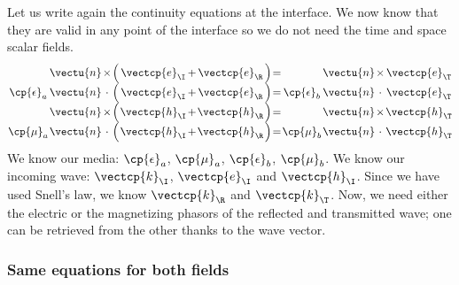 Let us write again the continuity equations at the interface.
We now know that they are valid in any point of the interface so we do not need the time and space scalar fields.
\begin{equation}
    \arraycolsep=0.5pt%
    \begin{array}{ccccccccccccc}
        & \vectu{n} & \times & \Big( & \vectcp{e}_\I & + & \vectcp{e}_\R & \Big) & = & & \vectu{n} & \times & \vectcp{e}_\T
        \\
        \cp{\epsilon}_a & \vectu{n} & \cdot & \Big( & \vectcp{e}_\I & + & \vectcp{e}_\R & \Big) & = & \cp{\epsilon}_b & \vectu{n} & \cdot & \vectcp{e}_\T
        \\
        & \vectu{n} & \times & \Big( & \vectcp{h}_\I & + & \vectcp{h}_\R & \Big) & = &  & \vectu{n} & \times & \vectcp{h}_\T
        \\
        \cp{\mu}_a & \vectu{n} & \cdot & \Big( & \vectcp{h}_\I & + & \vectcp{h}_\R & \Big) & = & \cp{\mu}_b & \vectu{n} & \cdot & \vectcp{h}_\T
    \end{array}
\end{equation}
We know our media: $\cp{\epsilon}_a$, $\cp{\mu}_a$, $\cp{\epsilon}_b$, $\cp{\mu}_b$.
We know our incoming wave: $\vectcp{k}_\I$, $\vectcp{e}_\I$ and $\vectcp{h}_\I$.
Since we have used Snell's law, we know $\vectcp{k}_\R$ and $\vectcp{k}_\T$.
Now, we need either the electric or the magnetizing phasors of the reflected and transmitted wave; one can be retrieved from the other thanks to the wave vector.




\subsubsection{Same equations for both fields}

